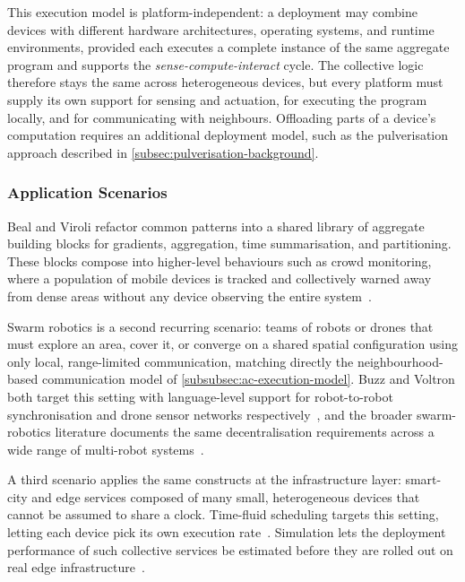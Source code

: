 This execution model is platform-independent:
a deployment may combine devices with different hardware architectures,
operating systems,
and runtime environments,
provided each executes a complete instance of the same aggregate program and supports the \emph{sense-compute-interact} cycle.
%
The collective logic therefore stays the same across heterogeneous devices,
but every platform must supply its own support for sensing and actuation,
for executing the program locally,
and for communicating with neighbours.
%
Offloading parts of a device's computation requires an additional deployment model,
such as the pulverisation approach described in \cref{subsec:pulverisation-background}.

\subsubsection{Application Scenarios}
\label{subsubsec:ac-application-scenarios}

Beal and Viroli refactor common patterns into a shared library of aggregate building blocks for gradients, aggregation, time summarisation, and partitioning.
These blocks compose into higher-level behaviours such as crowd monitoring,
where a population of mobile devices is tracked and collectively warned away from dense areas without any device observing the entire system~\cite{DBLP:conf/saso/BealV14a}.

Swarm robotics is a second recurring scenario:
teams of robots or drones that must explore an area,
cover it,
or converge on a shared spatial configuration using only local, range-limited communication,
matching directly the neighbourhood-based communication model of \cref{subsubsec:ac-execution-model}.
%
Buzz and Voltron both target this setting with language-level support for robot-to-robot synchronisation and drone sensor networks respectively~\cite{buzz-robot,voltron-robot},
and the broader swarm-robotics literature documents the same decentralisation requirements across a wide range of multi-robot systems~\cite{DBLP:journals/swarm/BrambillaFBD13}.

A third scenario applies the same constructs at the infrastructure layer:
smart-city and edge services composed of many small, heterogeneous devices that cannot be assumed to share a clock.
%
Time-fluid scheduling targets this setting,
letting each device pick its own execution rate~\cite{DBLP:journals/lmcs/PianiniCVMZ21}.
%
Simulation lets the deployment performance of such collective services be estimated before they are rolled out on real edge infrastructure~\cite{DBLP:journals/iotj/CasadeiFPPSV22}.

